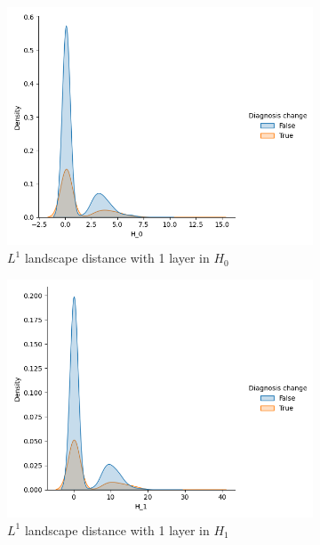 \documentclass{article}
\begin{document}
\begin{figure}
\begin{subfigure}{0.32\textwidth}
    \includegraphics[width=\textwidth]{figures/temporal_evolution/landscape_H_0_dist_diag_change.png}
    \caption{$L^{1}$ landscape distance with 1 layer in $H_0$}
  \end{subfigure}
  \begin{subfigure}{0.32\textwidth}
    \includegraphics[width=\textwidth]{figures/temporal_evolution/landscape_H_1_dist_diag_change.png}
    \caption{$L^{1}$ landscape distance with 1 layer in $H_1$}
  \end{subfigure}
  \begin{subfigure}{0.32\textwidth}

\end{subfigure}
\end{figure}
\end{document}
